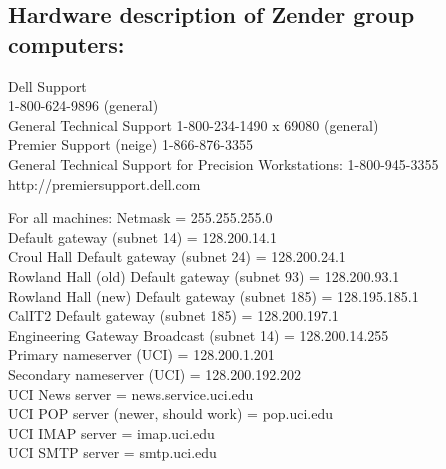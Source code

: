\documentclass[12pt,twoside]{article}
\begin{document}
\subsection{Hardware description of Zender group computers:}\label{sxn:hw}
Dell Support\\
1-800-624-9896 (general)\\
General Technical Support 1-800-234-1490 x 69080 (general) \\
Premier Support (neige) 1-866-876-3355 \\
General Technical Support for Precision Workstations: 1-800-945-3355
http://premiersupport.dell.com

For all machines:
Netmask = 255.255.255.0\\
Default gateway (subnet 14) = 128.200.14.1\\ Croul Hall
Default gateway (subnet 24) = 128.200.24.1\\ Rowland Hall (old)
Default gateway (subnet 93) = 128.200.93.1\\ Rowland Hall (new)
Default gateway (subnet 185) = 128.195.185.1\\ CalIT2
Default gateway (subnet 185) = 128.200.197.1\\ Engineering Gateway
Broadcast (subnet 14) = 128.200.14.255\\
Primary nameserver (UCI) = 128.200.1.201\\
Secondary nameserver (UCI) = 128.200.192.202\\
UCI News server = news.service.uci.edu\\
UCI POP server (newer, should work) = pop.uci.edu\\
UCI IMAP server = imap.uci.edu\\
UCI SMTP server = smtp.uci.edu\\
\end{document}
